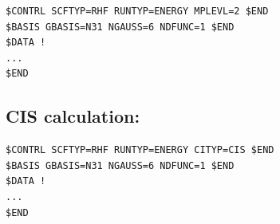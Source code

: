 \documentclass[11pt]{article}
\begin{document}
\begin{verbatim}
$CONTRL SCFTYP=RHF RUNTYP=ENERGY MPLEVL=2 $END
$BASIS GBASIS=N31 NGAUSS=6 NDFUNC=1 $END
$DATA !
...
$END
\end{verbatim}


\subsection{CIS calculation:}
\label{sec:orge84e835}

\begin{verbatim}
$CONTRL SCFTYP=RHF RUNTYP=ENERGY CITYP=CIS $END
$BASIS GBASIS=N31 NGAUSS=6 NDFUNC=1 $END
$DATA !
...
$END
\end{verbatim}
\end{document}
